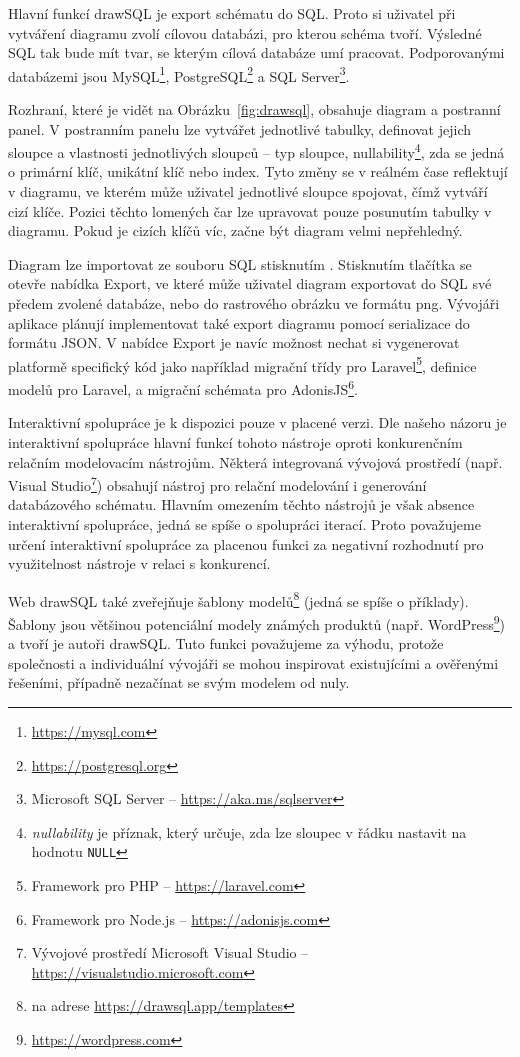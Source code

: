 Hlavní funkcí drawSQL je export schématu do SQL.
Proto si uživatel při vytváření diagramu zvolí cílovou databázi, pro kterou schéma tvoří.
Výsledné SQL tak bude mít tvar, se kterým cílová databáze umí pracovat.
Podporovanými databázemi jsou
MySQL\footnote{\url{https://mysql.com}},
PostgreSQL\footnote{\url{https://postgresql.org}}
a SQL Server\footnote{Microsoft SQL Server -- \url{https://aka.ms/sqlserver}}.

Rozhraní, které je vidět na Obrázku~\ref{fig:drawsql}, obsahuje diagram a postranní panel.
V postranním panelu lze vytvářet jednotlivé tabulky, definovat jejich sloupce a vlastnosti jednotlivých sloupců -- typ sloupce,
nullability\footnote{\emph{nullability} je příznak, který určuje, zda lze sloupec v řádku nastavit na hodnotu \texttt{NULL}},
zda se jedná o primární klíč, unikátní klíč nebo index.
Tyto změny se v reálném čase reflektují v diagramu, ve kterém může uživatel jednotlivé sloupce spojovat, čímž vytváří cizí klíče.
Pozici těchto lomených čar lze upravovat pouze posunutím tabulky v diagramu.
Pokud je cizích klíčů víc, začne být diagram velmi nepřehledný.

Diagram lze importovat ze souboru SQL stisknutím .
Stisknutím tlačítka  se otevře nabídka Export, ve které může uživatel diagram exportovat do SQL své předem zvolené databáze, nebo do rastrového obrázku ve formátu \acrshort{png}.
Vývojáři aplikace plánují implementovat také export diagramu pomocí serializace do formátu JSON.
V nabídce Export je navíc možnost nechat si vygenerovat platformě specifický kód jako například migrační třídy pro
Laravel\footnote{Framework pro PHP -- \url{https://laravel.com}},
definice modelů pro Laravel, a migrační schémata pro
AdonisJS\footnote{Framework pro Node.js -- \url{https://adonisjs.com}}.

Interaktivní spolupráce je k dispozici pouze v placené verzi.
Dle našeho názoru je interaktivní spolupráce hlavní funkcí tohoto nástroje oproti konkurenčním relačním modelovacím nástrojům.
Některá integrovaná vývojová prostředí (např. Visual Studio\footnote{Vývojové prostředí Microsoft Visual Studio -- \url{https://visualstudio.microsoft.com}}) obsahují nástroj pro relační modelování i generování databázového schématu.
Hlavním omezením těchto nástrojů je však absence interaktivní spolupráce, jedná se spíše o spolupráci iterací.
Proto považujeme určení interaktivní spolupráce za placenou funkci za negativní rozhodnutí pro využitelnost nástroje v relaci s konkurencí.

Web drawSQL také zveřejňuje šablony modelů\footnote{na adrese \url{https://drawsql.app/templates}} (jedná se spíše o příklady).
Šablony jsou většinou potenciální modely známých produktů (např. WordPress\footnote{\url{https://wordpress.com}}) a tvoří je autoři drawSQL.
Tuto funkci považujeme za výhodu, protože společnosti a individuální vývojáři se mohou inspirovat existujícími a ověřenými řešeními, případně nezačínat se svým modelem od nuly.

